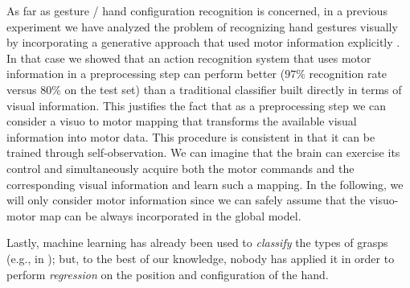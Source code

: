 As far as gesture / hand configuration recognition is concerned, in a
previous experiment we have analyzed the problem of recognizing hand
gestures visually by incorporating a generative approach that used
motor information explicitly \cite{lopes-05,metta-06}. In that case we
showed that an action recognition system that uses motor information
in a preprocessing step can perform better ($97\%$ recognition rate
versus $80\%$ on the test set) than a traditional classifier built
directly in terms of visual information. This justifies the fact that
as a preprocessing step we can consider a visuo to motor mapping that
transforms the available visual information into motor data. This
procedure is consistent in that it can be trained through
self-observation. We can imagine that the brain can exercise its
control and simultaneously acquire both the motor commands and the
corresponding visual information and learn such a mapping. In the
following, we will only consider motor information since we can safely
assume that the visuo-motor map can be always incorporated in the global
model.

Lastly, machine learning has already been used to \emph{classify} the
types of grasps (e.g., in \cite{degranville,heumer,ekvall}); but, to
the best of our knowledge, nobody has applied it in order to perform
\emph{regression} on the position and configuration of the hand.
